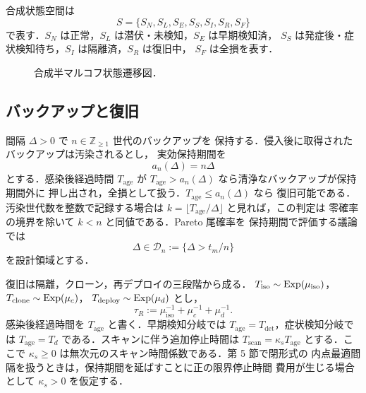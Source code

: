 合成状態空間は
\[
S=\{S_N,S_L,S_E,S_S,S_I,S_R,S_F\}
\]
で表す．$S_N$ は正常，$S_L$ は潜伏・未検知，$S_E$ は早期検知済，
$S_S$ は発症後・症状検知待ち，$S_I$ は隔離済，$S_R$ は復旧中，
$S_F$ は全損を表す．

\begin{figure}[htbp]
\centering
{}
\caption{合成半マルコフ状態遷移図．}
\end{figure}

\subsection{バックアップと復旧}

\begin{definition}[バックアップスケジュール]
間隔 $\Delta>0$ で $n\in\mathbb{Z}_{\ge1}$ 世代のバックアップを
保持する．侵入後に取得されたバックアップは汚染されるとし，
実効保持期間を
\[
  a_n(\Delta)=n\Delta
\]
とする．感染後経過時間 $T_{\mathrm{age}}$ が
$T_{\mathrm{age}}>a_n(\Delta)$ なら清浄なバックアップが保持期間外に
押し出され，全損として扱う．$T_{\mathrm{age}}\le a_n(\Delta)$ なら
復旧可能である．汚染世代数を整数で記録する場合は
$k=\lfloor T_{\mathrm{age}}/\Delta\rfloor$ と見れば，この判定は
零確率の境界を除いて $k<n$ と同値である．Pareto 尾確率を
保持期間で評価する議論では
\[
  \Delta\in\mathcal{D}_n:=\{\Delta>t_m/n\}
\]
を設計領域とする．
\end{definition}

\begin{definition}[コンテナベース復旧時間]
復旧は隔離，クローン，再デプロイの三段階から成る．
$T_{\mathrm{iso}}\sim\mathrm{Exp}(\mu_{\mathrm{iso}})$，
$T_{\mathrm{clone}}\sim\mathrm{Exp}(\mu_c)$，
$T_{\mathrm{deploy}}\sim\mathrm{Exp}(\mu_d)$ とし，
\[
  \tau_R:=\mu_{\mathrm{iso}}^{-1}+\mu_c^{-1}+\mu_d^{-1}.
\]
感染後経過時間を $T_{\mathrm{age}}$ と書く．早期検知分岐では
$T_{\mathrm{age}}=T_{\mathrm{det}}$，症状検知分岐では
$T_{\mathrm{age}}=T_d$ である．スキャンに伴う追加停止時間は
$T_{\mathrm{scan}}=\kappa_sT_{\mathrm{age}}$ とする．ここで
$\kappa_s\ge0$ は無次元のスキャン時間係数である．第 5 節で閉形式の
内点最適間隔を扱うときは，保持期間を延ばすことに正の限界停止時間
費用が生じる場合として $\kappa_s>0$ を仮定する．
\end{definition}

